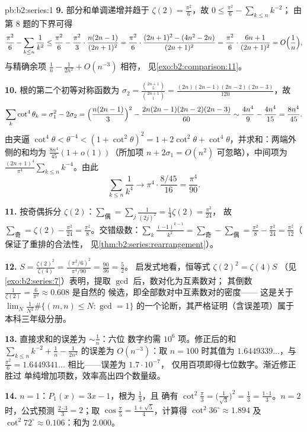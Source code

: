 \begin{solution}{pb:b2:series:1}
\textbf{9.} 部分和单调递增并趋于 $\zeta(2) =
\frac{\pi^2}6$，故 $0 \leq \frac{\pi^2}6 - \sum_{k\leq n}k^{-2}$；
由第 8 题的下界可得
\[
\frac{\pi^2}6 - \sum_{k\leq n}\frac1{k^2}
\leq \frac{\pi^2}6 - \frac{\pi^2}3\cdot\frac{n(2n-1)}{(2n+1)^2}
= \frac{\pi^2}6\cdot\frac{(2n+1)^2 - (4n^2 -
2n)}{(2n+1)^2}
= \frac{\pi^2}6\cdot\frac{6n + 1}{(2n+1)^2}
= O\Bigl(\frac1n\Bigr),
\]
与精确余项 $\frac1n - \frac1{2n^2} + O(n^{-3})$ 相符，
见\cref{exo:b2:comparison:11}。

\textbf{10.} 根的第二个初等对称函数为
$\sigma_2 = \frac{\binom{2n+1}5}{\binom{2n+1}1} =
\frac{(2n)(2n-1)(2n-2)(2n-3)}{120}$，故
\[
\sum_k\cot^4\theta_k = \sigma_1^2 - 2\sigma_2
= \Bigl(\frac{n(2n-1)}3\Bigr)^2 -
\frac{2n(2n-1)(2n-2)(2n-3)}{60}
\sim \frac{4n^4}9 - \frac{4n^4}{15} = \frac{8n^4}{45}.
\]
由夹逼 $\cot^4\theta < \theta^{-4} < (1 + \cot^2\theta)^2 =
1 + 2\cot^2\theta + \cot^4\theta$，并求和：两端外侧的和均为
$\frac{8n^4}{45}(1 + o(1))$（所加项 $n + 2\sigma_1 =
O(n^2)$ 可忽略），中间项为
$\frac{(2n+1)^4}{\pi^4}\sum_{k\leq n}k^{-4}$。由此
\[
\sum_{k\leq n}\frac1{k^4} \longrightarrow
\pi^4\cdot\frac{8/45}{16} = \frac{\pi^4}{90}.
\]

\textbf{11.} 按奇偶拆分 $\zeta(2)$：$\sum_{\text{偶}}
= \sum_j\frac{1}{(2j)^2} = \frac14\zeta(2) = \frac{\pi^2}{24}$，
故 $\sum_{\text{奇}} = \zeta(2) - \frac{\pi^2}{24} =
\frac{\pi^2}8$。交错级数：$\sum_k\frac{(-1)^{k-1}}{k^2} =
\sum_{\text{奇}} - \sum_{\text{偶}} = \frac{\pi^2}8 -
\frac{\pi^2}{24} = \frac{\pi^2}{12}$（
保证了重排的合法性，
见\cref{thm:b2:series:rearrangement}）。

\textbf{12.} $S = \frac{\zeta(2)^2}{\zeta(4)} =
\frac{(\pi^2/6)^2}{\pi^4/90} = \frac{90}{36} = \frac52$。
启发式地看，恒等式 $\zeta(2)^2 = \zeta(4)S$
（见\cref{exo:b2:series:7}）表明，提取 $\gcd$ 后，数对化为互素数对；
其倒数
$\frac1{\zeta(2)} = \frac6{\pi^2} \approx 0.608$ 是自然的
候选，即全部数对中互素数对的密度——
这是关于 $\lim_N \frac{1}{N^2}\#\{(m,n) \leq N :
\gcd = 1\}$ 的一个论断，其严格证明（含误差项）属于
本科三年级分册。

\textbf{13.} 直接求和的误差为 $\sim \frac1n$：六位
数字约需 $10^6$ 项。修正后的和
$\sum_{k\leq n}k^{-2} + \frac1n - \frac1{2n^2}$ 的误差为
$O(n^{-3})$：取 $n = 100$ 时其值为 $1.6449339\dots$，与
$\frac{\pi^2}6 = 1.6449341\dots$ 相比——误差为 $1.7\cdot10^{-7}$，
仅用百项即得七位数字。渐近修正胜过
单纯增加项数，效率高出四个数量级。

\textbf{14.} $n = 1$：$P_1(x) = 3x - 1$，根为 $\frac13$，且
确有 $\cot^2\frac\pi3 = \bigl(\frac1{\sqrt3}\bigr)^2 =
\frac13 = \frac{1\cdot1}3$。$n = 2$ 时，公式预测
$\frac{2\cdot3}3 = 2$；取 $\cos\frac\pi5 = \frac{1 +
\sqrt5}{4}$，计算得 $\cot^2 36^\circ \approx 1.894$ 及
$\cot^2 72^\circ \approx 0.106$：和为 $2.000$。


\end{solution}

